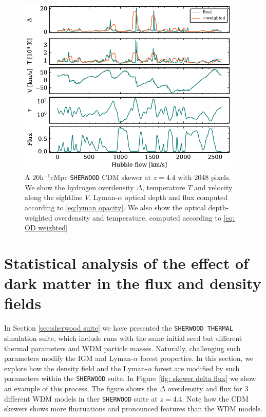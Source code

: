 \begin{figure}
        \centering
        \includegraphics[width=0.95\textwidth]{img/ML/Skewer_OD_quantities.pdf}
        \caption{A 20h$^{-1}$cMpc \texttt{SHERWOOD} CDM skewer at $z=4.4$ with 2048 pixels. We show the hydrogen overdensity $\Delta$, temperature $T$ and velocity along the sightline $V$, Lyman-$\alpha$ optical depth and flux computed according to \ref{eq:lyman opacity}. We also show the optical depth-weighted overdensity and temperature, computed according to \ref{eq: OD weighted}}
        \label{fig: skewer sherwood}     
\end{figure}













\section{Statistical analysis of the effect of dark matter in the flux and density fields}\label{sec:statistics sher}


In Section \ref{sec:sherwood suite} we have presented the \texttt{SHERWOOD THERMAL} simulation suite, which include runs with the same initial seed but different thermal parameters and WDM particle masses. Naturally, challenging such parameters modify the IGM and Lyman-$\alpha$ forest properties. In this section, we explore how the density field and the Lyman-$\alpha$ forest are modified by such parameters within the \texttt{SHERWOOD} suite. In Figure \ref{fig: skewer delta flux} we show an example of this process. The figure shows the $\Delta$ overdensity and flux for 3 different WDM models in ther \texttt{SHERWOOD} suite at $z=4.4$. Note how the CDM skewers shows more fluctuations and pronounced features than the WDM models.

